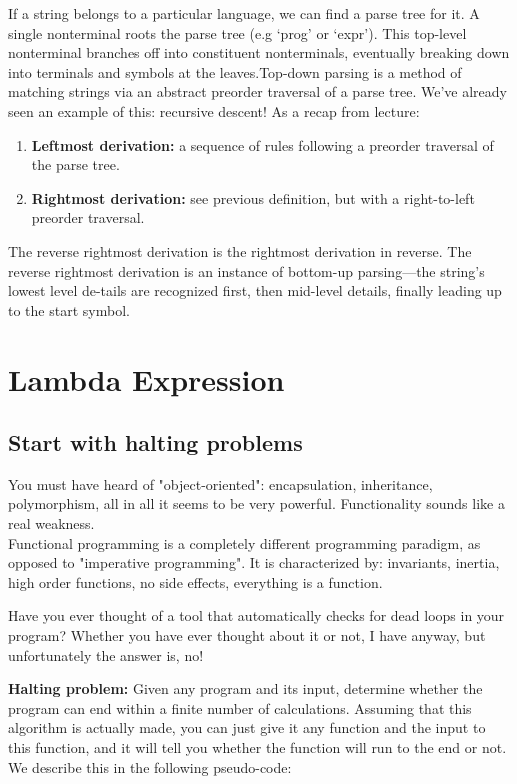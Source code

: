 \documentclass[a4paper]{exam}
\begin{document}
If a string belongs to a particular language, we can find a parse tree for it.  A single nonterminal  roots  the  parse  tree  (e.g  ‘prog’  or  ‘expr’).   This  top-level  nonterminal branches off into constituent nonterminals, eventually breaking down into terminals and symbols at the leaves.Top-down parsing is a method of matching strings via an abstract preorder traversal of a parse tree.  We’ve already seen an example of this: recursive descent!  As a recap from lecture:
\begin {enumerate}
\item \textbf{Leftmost derivation:}  a  sequence  of  rules  following  a preorder traversal  of  the parse tree.
\item \textbf{Rightmost derivation:} see previous definition, but with a right-to-left preorder traversal.
\end{enumerate}

The reverse rightmost derivation is the rightmost derivation in reverse.  The reverse rightmost derivation is an instance of bottom-up parsing—the string’s lowest level de-tails are recognized first, then mid-level details, finally leading up to the start symbol.

\section{Lambda Expression\cite{byvoidlambda}}

\subsection{Start with halting problems}

You must have heard of "object-oriented": encapsulation, inheritance, polymorphism, all in all it seems to be very powerful. Functionality sounds like a real weakness.
\\
Functional programming is a completely different programming paradigm, as opposed to "imperative programming". It is characterized by: invariants, inertia, high order functions, no side effects, everything is a function.

Have you ever thought of a tool that automatically checks for dead loops in your program? Whether you have ever thought about it or not, I have anyway, but unfortunately the answer is, no!

\textbf{Halting problem:} Given any program and its input, determine whether the program can end within a finite number of calculations. Assuming that this algorithm is actually made, you can just give it any function and the input to this function, and it will tell you whether the function will run to the end or not.
We describe this in the following pseudo-code:
\end{document}
